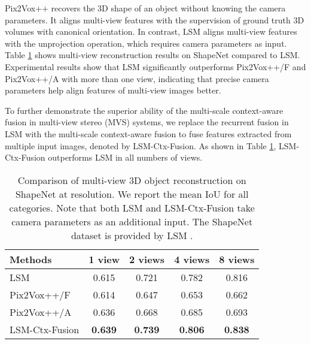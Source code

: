 \documentclass[twocolumn]{svjour3}
\begin{document}
Pix2Vox++ recovers the 3D shape of an object without knowing the camera parameters.
It aligns multi-view features with the supervision of ground truth 3D volumes with canonical orientation.
In contrast, LSM \citep{DBLP:conf/nips/KarHM17} aligns multi-view features with the unprojection operation, which requires camera parameters as input.
Table \ref{tab:lsm-multi-view-reconstruction} shows multi-view reconstruction results on ShapeNet compared to LSM.
Experimental results show that LSM significantly outperforms Pix2Vox++/F and Pix2Vox++/A with more than one view, indicating that precise camera parameters help align features of multi-view images better.

To further demonstrate the superior ability of the multi-scale context-aware fusion in multi-view stereo (MVS) systems, we replace the recurrent fusion in LSM with the multi-scale context-aware fusion to fuse features extracted from multiple input images, denoted by LSM-Ctx-Fusion.
As shown in Table \ref{tab:lsm-multi-view-reconstruction}, LSM-Ctx-Fusion outperforms LSM in all numbers of views.

\begin{table}
  \centering
  \caption{Comparison of multi-view 3D object reconstruction on ShapeNet at  resolution. We report the mean IoU for all categories. Note that both LSM and LSM-Ctx-Fusion take camera parameters as an additional input. The ShapeNet dataset is provided by LSM \citep{DBLP:conf/nips/KarHM17}.}
  \begin{tabularx}{\linewidth}{lcccc}
    \toprule
    Methods        & 1 view    & 2 views   & 4 views   & 8 views\\
    \midrule
    LSM            & 0.615     & 0.721     & 0.782     & 0.816 \\
    Pix2Vox++/F    & 0.614     & 0.647     & 0.653     & 0.662 \\
    Pix2Vox++/A    & 0.636     & 0.668     & 0.685     & 0.693 \\
    \midrule
    LSM-Ctx-Fusion & \bf{0.639}& \bf{0.739}& \bf{0.806}& \bf{0.838}\\
    \bottomrule
  \end{tabularx}
  \label{tab:lsm-multi-view-reconstruction}
\end{table}
\end{document}

